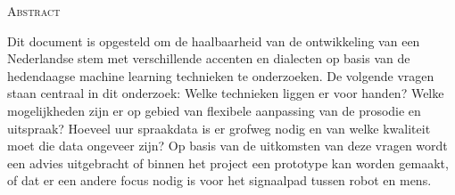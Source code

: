 \begin{center}
  \textsc{Abstract}
\end{center}
%
\noindent
%
Dit document is opgesteld om de haalbaarheid van de ontwikkeling van een Nederlandse stem met verschillende accenten en dialecten op basis van de hedendaagse machine learning technieken te onderzoeken. De volgende vragen staan centraal in dit onderzoek: Welke technieken liggen er voor handen? Welke mogelijkheden zijn er op gebied van flexibele aanpassing van de prosodie en uitspraak? Hoeveel uur spraakdata is er grofweg nodig en van welke kwaliteit moet die data ongeveer zijn? Op basis van de uitkomsten van deze vragen wordt een advies uitgebracht of binnen het project een prototype kan worden gemaakt, of dat er een andere focus nodig is voor het signaalpad tussen robot en mens.
